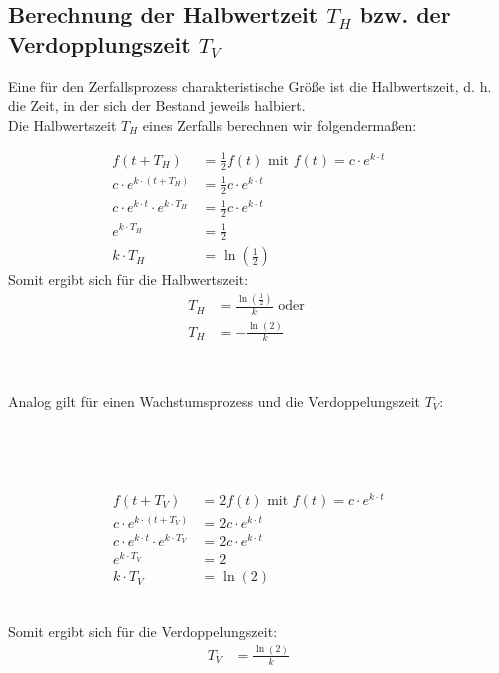\subsection{Berechnung der Halbwertzeit $T_H$ bzw. der Verdopplungszeit $T_V$} 
\begin{minipage}[t]{0.49\textwidth}
    Eine für den Zerfallsprozess charakteristische Größe ist die Halbwertszeit, d. h. die Zeit, in der sich der Bestand jeweils halbiert.\\

    Die Halbwertszeit $T_H$ eines Zerfalls berechnen wir folgendermaßen:

    \begin{align*}
        f(t + T_H) & = \frac{1}{2} f(t) \text{ mit } f(t) = c \cdot e^{k \cdot t} && \\
        c \cdot e^{k \cdot (t + T_H)} & = \frac{1}{2} c \cdot e^{k \cdot t} && \\
        c \cdot e^{k \cdot t} \cdot e^{k \cdot T_H} & = \frac{1}{2} c \cdot e^{k \cdot t} && \\
        e^{k \cdot T_H} & = \frac{1}{2} && \\
        k \cdot T_H & = \ln{\left(\frac{1}{2}\right)} && 
    \end{align*}
    Somit ergibt sich für die Halbwertszeit:
    \begin{align*}
        T_H & = \frac{\ln{\left(\frac{1}{2}\right)}}{k} \text{ oder } && \\
        T_H & = -\frac{\ln{(2)}}{k}
    \end{align*}
\end{minipage}
\begin{minipage}{0.02\textwidth}
    \
\end{minipage}
\begin{minipage}[t]{0.49\textwidth}
    Analog gilt für einen Wachstumsprozess und die Verdoppelungszeit $T_V$: \\
    \ \\
    \ \\
    \ \\
    \ \\
    \begin{align*}
        f(t + T_V) & = 2 f(t) \text{ mit } f(t) = c \cdot e^{k \cdot t} && \\
        c \cdot e^{k \cdot (t + T_V)} & = 2 c \cdot e^{k \cdot t} && \\
        c \cdot e^{k \cdot t} \cdot e^{k \cdot T_V} & = 2 c \cdot e^{k \cdot t} && \\
        e^{k \cdot T_V} & = 2 && \\
        k \cdot T_V & = \ln{(2)} && 
    \end{align*}
    \ \\
    \vspace{1.5pt}
    
    Somit ergibt sich für die Verdoppelungszeit:
    \begin{align*}
        T_V & = \frac{\ln{(2)}}{k}&& \\
    \end{align*}
\end{minipage}